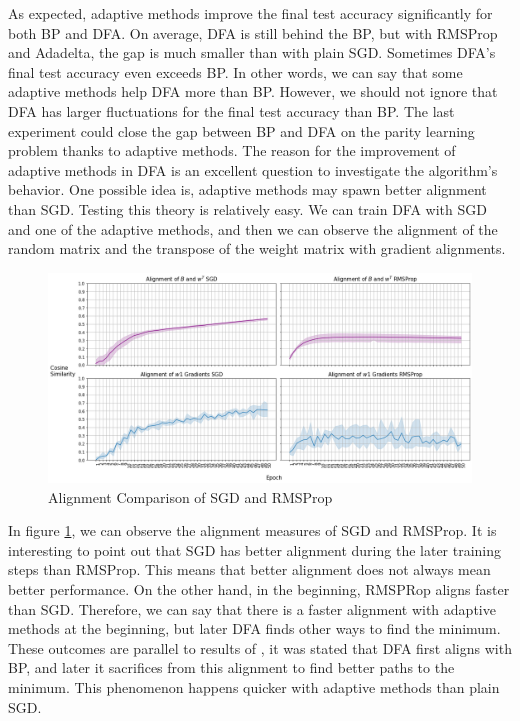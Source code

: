 \documentclass[a4paper, nobind]{templates/ociamthesis}
\begin{document}
\noindent As expected, adaptive methods improve the final test accuracy significantly for both BP and DFA. On average, DFA is still behind the BP, but with RMSProp and Adadelta, the gap is much smaller than with plain SGD. Sometimes DFA's final test accuracy even exceeds BP. In other words, we can say that some adaptive methods help DFA more than BP. However, we should not ignore that DFA has larger fluctuations for the final test accuracy than BP. The last experiment could close the gap between BP and DFA on the parity learning problem thanks to adaptive methods.
\noindent The reason for the improvement of adaptive methods in DFA is an excellent question to investigate the algorithm's behavior. One possible idea is, adaptive methods may spawn better alignment than SGD. Testing this theory is relatively easy. We can train DFA with SGD and one of the adaptive methods, and then we can observe the alignment of the random matrix and the transpose of the weight matrix with gradient alignments.

\begin{figure}

{\centering \includegraphics[width=1\linewidth]{figures/3_k3_SGD_Adadelta_DFA_Alingment} 

}

\caption{Alignment Comparison of SGD and RMSProp}\label{fig:Alignment}
\end{figure}

\noindent In figure \ref{fig:Alignment}, we can observe the alignment measures of SGD and RMSProp. It is interesting to point out that SGD has better alignment during the later training steps than RMSProp. This means that better alignment does not always mean better performance. On the other hand, in the beginning, RMSPRop aligns faster than SGD. Therefore, we can say that there is a faster alignment with adaptive methods at the beginning, but later DFA finds other ways to find the minimum. These outcomes are parallel to results of \cite{refinetti2021align}, it was stated that DFA first aligns with BP, and later it sacrifices from this alignment to find better paths to the minimum. This phenomenon happens quicker with adaptive methods than plain SGD.
\end{document}
